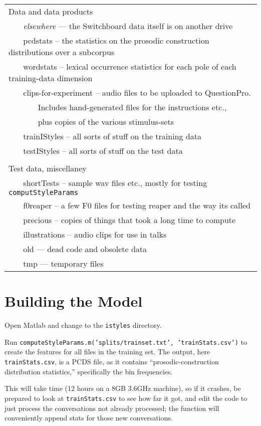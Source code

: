 \documentclass[11pt]{article}
\begin{document}
\begin{tabular}{l}
Data and data products \\
~~~ {\it elsewhere} --- the Switchboard data itself is on another drive\\ 
~~~ pcdstats -- the statistics on the prosodic construction distributions over a subcorpus \\
~~~ wordstats -- lexical occurrence statistics for each pole of each training-data dimension \\
~~~ clips-for-experiment -- audio files to be uploaded to QuestionPro.  \\
~~~ ~~~ Includes hand-generated files for the instructions etc., \\
~~~ ~~~ plus copies of the various stimulus-sets \\
~~~ trainIStyles -- all sorts of stuff on the training data  \\
~~~ testIStyles -- all sorts of  stuff on the test data  \\
\\
Test data, miscellaney \\
~~~ shortTests  -- sample wav files etc., mostly for testing {\tt computStyleParams} \\
~~~ f0reaper -- a few F0 files for testing reaper and the way its called \\
~~~ precious -- copies of things that took a long time to compute \\
~~~ illustrations -- audio clips for use in talks \\
~~~ old --- dead code and obsolete data \\
~~~ tmp --- temporary files 
\end{tabular}



\section{Building the Model}

Open Matlab and change to the {\tt istyles} directory.


Run {\tt computeStyleParams.m('splits/trainset.txt',
  'trainStats.csv')} to create the features for all files in the
training set.  The output, here {\tt trainStats.csv}, is
 a PCDS file, as it contains ``prosodic-construction distribution
statistics,'' specifically the bin frequencies.

This will take time (12 hours on a 8GB 3.6GHz machine), so if it crashes,
be prepared to look at {\tt trainStats.csv} to see how far it got, and
edit the code to just process the conversations not already processed;
the function will conveniently append stats for those new
conversations.
\end{document}
